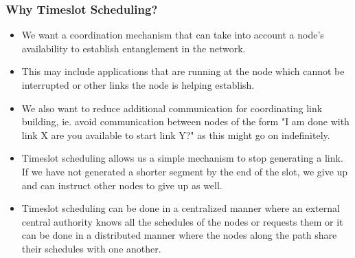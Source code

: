 \documentclass{article}
\begin{document}
\subsubsection{Why Timeslot Scheduling?}
\begin{itemize}
    \item We want a coordination mechanism that can take into account a node's availability to establish entanglement in the network.
    \item This may include applications that are running at the node which cannot be interrupted or other links the node is helping establish.
    \item We also want to reduce additional communication for coordinating link building, ie. avoid communication between nodes of the form "I am done with link X are you available to start link Y?" as this might go on indefinitely.
    \item Timeslot scheduling allows us a simple mechanism to stop generating a link.  If we have not generated a shorter segment by the end of the slot, we give up and can instruct other nodes to give up as well.
    \item Timeslot scheduling can be done in a centralized manner where an external central authority knows all the schedules of the nodes or requests them or it can be done in a distributed manner where the nodes along the path share their schedules with one another.
\end{itemize}
\end{document}
